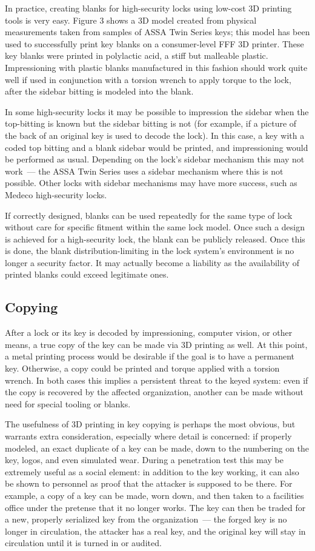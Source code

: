 \documentclass{acm_proc_article-sp}
\begin{document}
In practice, creating blanks for high-security locks using low-cost 3D printing tools is very easy. Figure 3 shows a 3D model created from physical measurements taken from samples of ASSA Twin Series keys; this model has been used to successfully print key blanks on a consumer-level FFF 3D printer. These key blanks were printed in polylactic acid, a stiff but malleable plastic. Impressioning with plastic blanks manufactured in this fashion should work quite well if used in conjunction with a torsion wrench to apply torque to the lock, after the sidebar bitting is modeled into the blank.

In some high-security locks it may be possible to impression the sidebar when the top-bitting is known but the sidebar bitting is not (for example, if a picture of the back of an original key is used to decode the lock). In this case, a key with a coded top bitting and a blank sidebar would be printed, and impressioning would be performed as usual. Depending on the lock's sidebar mechanism this may not work~--- the ASSA Twin Series uses a sidebar mechanism where this is not possible. Other locks with sidebar mechanisms may have more success, such as Medeco high-security locks.

If correctly designed, blanks can be used repeatedly for the same type of lock without care for specific fitment within the same lock model. Once such a design is achieved for a high-security lock, the blank can be publicly released. Once this is done, the blank distribution-limiting in the lock system's environment is no longer a security factor. It may actually become a liability as the availability of printed blanks could exceed legitimate ones.

\subsection{Copying}
After a lock or its key is decoded by impressioning, computer vision, or other means, a true copy of the key can be made via 3D printing as well. At this point, a metal printing process would be desirable if the goal is to have a permanent key. Otherwise, a copy could be printed and torque applied with a torsion wrench. In both cases this implies a persistent threat to the keyed system: even if the copy is recovered by the affected organization, another can be made without need for special tooling or blanks.

The usefulness of 3D printing in key copying is perhaps the most obvious, but warrants extra consideration, especially where detail is concerned: if properly modeled, an exact duplicate of a key can be made, down to the numbering on the key, logos, and even simulated wear. During a penetration test this may be extremely useful as a social element: in addition to the key working, it can also be shown to personnel as proof that the attacker is supposed to be there.  For example, a copy of a key can be made, worn down, and then taken to a facilities office under the pretense that it no longer works. The key can then be traded for a new, properly serialized key from the organization~--- the forged key is no longer in circulation, the attacker has a real key, and the original key will stay in circulation until it is turned in or audited.
\end{document}
